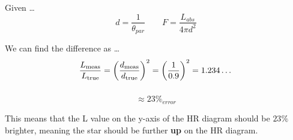 \documentclass{article}
\begin{document}
\subsubsection{}
Given \dots
\[d = \frac{1}{\theta_{par}} \qquad F = \frac{L_{abs}}{4\pi d^2} \]

We can find the difference as \dots
\[
\frac{L_{\rm meas}}{L_{\rm true}}
= \left(\frac{d_{\rm meas}}{d_{\rm true}}\right)^2
= \left(\frac{1}{0.9}\right)^2
= 1.234\dots
\]

\subsubsection{}
\[\approx 23\%_{error}\]

\begin{center}
    This means that the L value on the y-axis of the HR diagram should be \(23\%\) brighter, meaning the star should be further \textbf{up} on the HR diagram.
\end{center}



\end{document}
